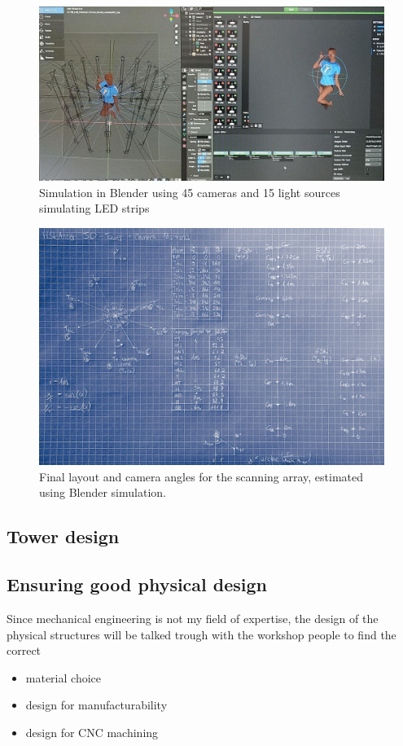 	\begin{figure}[H]
        \centerline{\includegraphics[width=\linewidth]{how/blender-sim.jpg}}
        \caption{Simulation in Blender using 45 cameras and 15 light sources simulating LED strips}
    \label{blender-sim}
    \end{figure}
    
    	\begin{figure}[H]
        \centerline{\includegraphics[width=\linewidth]{how/array-layout-paper.jpg}}
        \caption{Final layout and camera angles for the scanning array, estimated using Blender simulation.}
    \label{array-layout-paper}
    \end{figure}
    
    \subsection{Tower design}
	
	
\subsection{Ensuring good physical design}	
	Since mechanical engineering is not my field of expertise, the design of the physical structures will be talked trough with the workshop people to find the correct
	\begin{itemize}
		\item material choice
		\item design for manufacturability
		\item design for CNC machining
	\end{itemize}
	
